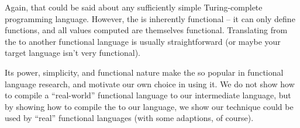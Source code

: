 \documentclass[12pt]{report}
\begin{document}
Again, that could be said about any sufficiently simple
Turing-complete programming language. However, the \lamA is inherently
functional -- it can only define functions, and all values computed
are themselves functional. Translating from the \lamA to
another functional language is usually straightforward (or maybe your
target language isn't very functional). 

Its power, simplicity, and functional nature make the \lamA so popular
in functional language research, and motivate our own choice in using
it. We do not show how to compile a ``real-world'' functional language
to our intermediate language, but by showing how to compile the 
\lamA to our language, we show our technique could be used by ``real'' 
functional languages (with some adaptions, of course).








\end{document}
